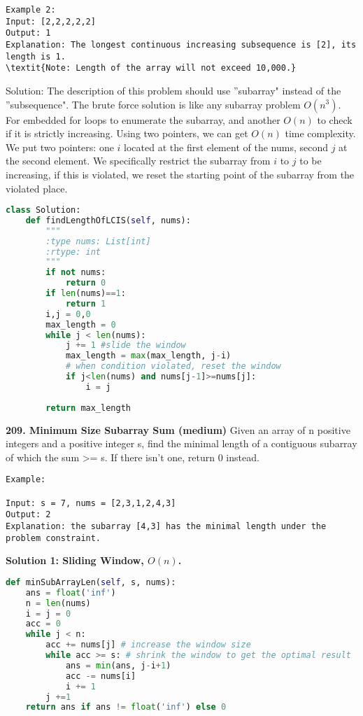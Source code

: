 \documentclass[../main.tex]{subfiles}
\begin{document}
\begin{examples}[resume]
\begin{lstlisting}[numbers=none]
Example 2:
Input: [2,2,2,2,2]
Output: 1
Explanation: The longest continuous increasing subsequence is [2], its length is 1.
\textit{Note: Length of the array will not exceed 10,000.}
\end{lstlisting}
Solution: The description of this problem should use ''subarray" instead of the ''subsequence".  The brute force solution is like any subarray problem $O(n^3)$. For embedded for loops to enumerate the subarray, and another $O(n)$ to check if it is strictly increasing.  Using two pointers, we can get $O(n)$ time complexity. We put two pointers: one $i$ located at the first element of the nums, second $j$ at the second element. We specifically restrict the subarray from $i$ to $j$ to be increasing, if this is violated, we reset the starting point of the subarray from the violated place.  
\begin{lstlisting}[language = Python]
class Solution:
    def findLengthOfLCIS(self, nums):
        """
        :type nums: List[int]
        :rtype: int
        """
        if not nums:
            return 0
        if len(nums)==1:
            return 1
        i,j = 0,0
        max_length = 0
        while j < len(nums):
            j += 1 #slide the window
            max_length = max(max_length, j-i)
            # when condition violated, reset the window
            if j<len(nums) and nums[j-1]>=nums[j]:
                i = j
                         
        return max_length
\end{lstlisting}
\item \textbf{209. Minimum Size Subarray Sum (medium)} Given an array of n positive integers and a positive integer s, find the minimal length of a contiguous subarray of which the sum >= s. If there isn't one, return 0 instead.
\begin{lstlisting}[numbers=none]
Example: 

Input: s = 7, nums = [2,3,1,2,4,3]
Output: 2
Explanation: the subarray [4,3] has the minimal length under the problem constraint.
\end{lstlisting}

\textbf{Solution 1: Sliding Window, $O(n)$.}
\begin{lstlisting}[language=Python]
def minSubArrayLen(self, s, nums):
    ans = float('inf')
    n = len(nums)
    i = j = 0
    acc = 0
    while j < n:
        acc += nums[j] # increase the window size
        while acc >= s: # shrink the window to get the optimal result
            ans = min(ans, j-i+1)
            acc -= nums[i]
            i += 1
        j +=1
    return ans if ans != float('inf') else 0
\end{lstlisting}


\end{examples}
\end{document}
